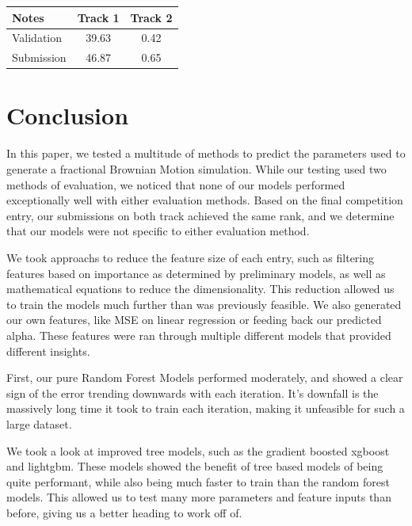 \documentclass[a4paper, 12pt]{article}
\begin{document}
\begin{multicols}{2}
                \begin{center}
                    \begin{tabular}{l|cc}
                        Notes & Track 1 & Track 2 \\
                        \hline
                        Validation & 39.63 & 0.42 \\
                        Submission & 46.87 & 0.65
                    \end{tabular}
                    \label{uniform}
                \end{center}
            \end{multicols}
            \vskip 4.3cm
        \section{Conclusion}
                In this paper, we tested a multitude of methods to predict the parameters used to generate a fractional Brownian Motion simulation. While our testing used two methods of evaluation, we noticed that none of our models performed exceptionally well with either evaluation methods. Based on the final competition entry, our submissions on both track achieved the same rank, and we determine that our models were not specific to either evaluation method.
                
                We took approachs to reduce the feature size of each entry, such as filtering features based on importance as determined by preliminary models, as well as mathematical equations to reduce the dimensionality. This reduction allowed us to train the models much further than was previously feasible. We also generated our own features, like MSE on linear regression or feeding back our predicted alpha. These features were ran through multiple different models that provided different insights.
                
                First, our pure Random Forest Models performed moderately, and showed a clear sign of the error trending downwards with each iteration. It's downfall is the massively long time it took to train each iteration, making it unfeasible for such a large dataset. 
                
                We took a look at improved tree models, such as the gradient boosted xgboost and lightgbm. These models showed the benefit of tree based models of being quite performant, while also being much faster to train than the random forest models. This allowed us to test many more parameters and feature inputs than before, giving us a better heading to work off of.
\end{document}
